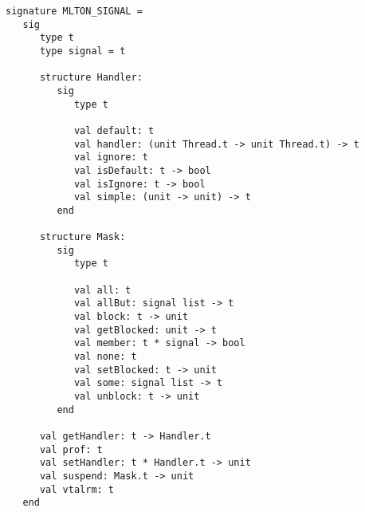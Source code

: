 \begin{verbatim}
signature MLTON_SIGNAL =
   sig
      type t
      type signal = t

      structure Handler:
         sig
            type t

            val default: t
            val handler: (unit Thread.t -> unit Thread.t) -> t
            val ignore: t
            val isDefault: t -> bool
            val isIgnore: t -> bool
            val simple: (unit -> unit) -> t
         end

      structure Mask:
         sig
            type t
               
            val all: t
            val allBut: signal list -> t
            val block: t -> unit
            val getBlocked: unit -> t
            val member: t * signal -> bool
            val none: t
            val setBlocked: t -> unit
            val some: signal list -> t
            val unblock: t -> unit
         end

      val getHandler: t -> Handler.t
      val prof: t
      val setHandler: t * Handler.t -> unit
      val suspend: Mask.t -> unit
      val vtalrm: t
   end
\end{verbatim}


